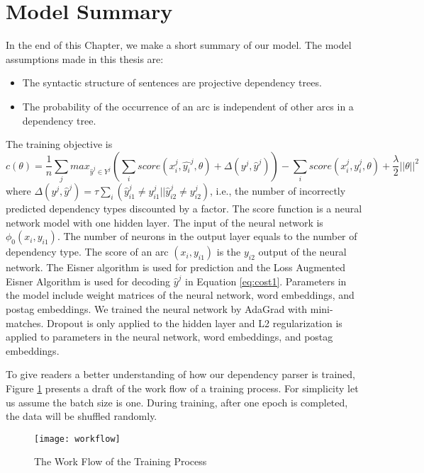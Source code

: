 \section{Model Summary}
\label{sec:Model setting}
In the end of this Chapter, we make a short summary of our model. The model assumptions made in this thesis are:
\begin{itemize}  
\item The syntactic structure of sentences are projective dependency trees.
\item The probability of the occurrence of an arc is independent of other arcs in a dependency tree. 
\end{itemize}
The training objective is 
\begin{equation}
\label{eq:cost1}
c(\theta)=\frac{1}{n}\sum_j{max_{\hat{y}^j\in Y^j}(\sum_i score(x_i^j,\hat{y_i}^j,\theta)+\Delta(y^j,\hat{y}^j))-\sum_i score(x_i^j,y_i^j,\theta)+\frac{\lambda}{2}||\theta||^2}
\end{equation}
where $\Delta(y^j,\hat{y}^j)=\tau \sum_i (\hat{y}_{i1}^j\neq y_{i1}^j|| \hat{y}_{i2}^j\neq y_{i2}^j)$, i.e., the number of incorrectly predicted dependency types discounted by a factor.
The score function is a neural network model with one hidden layer. The input of the neural network is $\phi_0(x_i,y_{i1})$. The number of neurons in the output layer equals to the number of dependency type. The score of an arc $(x_i,y_{i1})$ is the $y_{i2}$ output of the neural network. The Eisner algorithm is used for prediction and the Loss Augmented Eisner Algorithm is used for decoding $\hat{y}^j$ in Equation \ref{eq:cost1}. Parameters in the model include weight matrices of the neural network, word embeddings, and postag embeddings. We trained the neural network by AdaGrad with mini-matches. Dropout is only applied to the hidden layer and L2 regularization is applied to parameters in the neural network, word embeddings, and postag embeddings. 

To give readers a better understanding of how our dependency parser is trained, Figure \ref{fig:workflow} presents a draft of the work flow of a training process. For simplicity let us assume the batch size is one. During training, after one epoch is completed, the data will be shuffled randomly.
\begin{figure}
  \centering
    \texttt{[image: workflow]}
  \caption{The Work Flow of the Training Process}
  \label{fig:workflow}
\end{figure}



